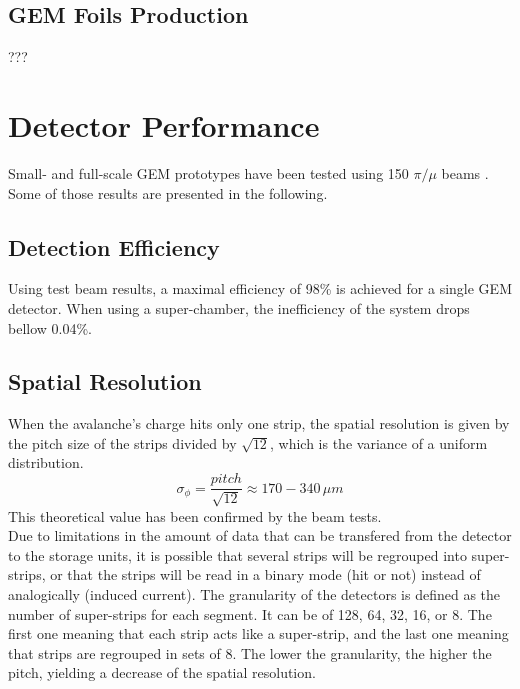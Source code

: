         \subsection{GEM Foils Production}

            ???

    \section{Detector Performance}

        Small- and full-scale GEM prototypes have been tested using 150 \GeVc{} $ \pi / \mu $ beams \Cite{GEM_Construction_and_Performance, GEM_Test_in_Beam_1, GEM_Test_in_Beam_2, GEM_Test_in_Beam_3, GEM_Test_in_Beam_4}. Some of those results are presented in the following.

        \subsection{Detection Efficiency}

            Using test beam results, a maximal efficiency of 98\% is achieved for a single GEM detector. When using a super-chamber, the inefficiency of the system drops bellow 0.04\%.

        \subsection{Spatial Resolution}

            When the avalanche's charge hits only one strip, the spatial resolution is given by the pitch size of the strips divided by $ \sqrt{12} $, which is the variance of a uniform distribution. 
            \begin{equation} 
                \sigma_{\phi} = \frac{pitch}{\sqrt{12}} \approx 170 - 340 \, \mu m
            \end{equation}
            This theoretical value has been confirmed by the beam tests. \\

            Due to limitations in the amount of data that can be transfered from the detector to the storage units, it is possible that several strips will be regrouped into super-strips, or that the strips will be read in a binary mode (hit or not) instead of analogically (induced current). The granularity of the detectors is defined as the number of super-strips for each segment. It can be of 128, 64, 32, 16, or 8. The first one meaning that each strip acts like a super-strip, and the last one meaning that strips are regrouped in sets of 8. The lower the granularity, the higher the pitch, yielding a decrease of the spatial resolution.


